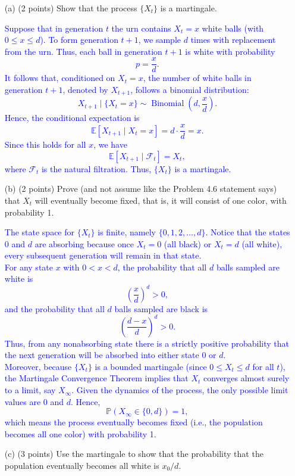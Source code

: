 \documentclass{article}
\begin{document}
\begin{enumerate}
    \item[(a)] (2 points) Show that the process $\{X_t\}$ is a martingale.

        \textcolor{blue}{Suppose that in generation $t$ the urn contains $X_t = x$ white balls (with $0\le x\le d$). To form generation $t+1$, we sample $d$ times with replacement from the urn. Thus, each ball in generation $t+1$ is white with probability
\[
p = \frac{x}{d}.
\]
It follows that, conditioned on $X_t=x$, the number of white balls in generation $t+1$, denoted by $X_{t+1}$, follows a binomial distribution:
\[
X_{t+1}\mid \{X_t=x\} \sim \operatorname{Binomial}\left(d, \frac{x}{d}\right).
\]
Hence, the conditional expectation is
\[
\mathbb{E}[X_{t+1}\mid X_t=x] = d\cdot \frac{x}{d} = x.
\]
Since this holds for all $x$, we have
\[
\mathbb{E}[X_{t+1}\mid \mathcal{F}_t] = X_t,
\]
where $\mathcal{F}_t$ is the natural filtration. Thus, $\{X_t\}$ is a martingale.
}


    \item[(b)] (2 points) Prove (and not assume like the Problem 4.6 statement says) that $X_t$ will eventually become fixed, that is, it will consist of one color, with probability 1.

    \textcolor{blue}{
        The state space for $\{X_t\}$ is finite, namely $\{0,1,2,\ldots,d\}$. Notice that the states $0$ and $d$ are absorbing because once $X_t=0$ (all black) or $X_t=d$ (all white), every subsequent generation will remain in that state. \\
For any state $x$ with $0 < x < d$, the probability that all $d$ balls sampled are white is
\[
\left(\frac{x}{d}\right)^d > 0,
\]
and the probability that all $d$ balls sampled are black is
\[
\left(\frac{d-x}{d}\right)^d > 0.
\]
Thus, from any nonabsorbing state there is a strictly positive probability that the next generation will be absorbed into either state $0$ or $d$. \\ 
Moreover, because $\{X_t\}$ is a bounded martingale (since $0\le X_t\le d$ for all $t$), the Martingale Convergence Theorem implies that $X_t$ converges almost surely to a limit, say $X_\infty$. Given the dynamics of the process, the only possible limit values are $0$ and $d$. Hence,
\[
\mathbb{P}(X_\infty\in\{0,d\})=1,
\]
which means the process eventually becomes fixed (i.e., the population becomes all one color) with probability 1.
}

    \item[(c)] (3 points) Use the martingale to show that the probability that the population eventually becomes all white is $x_0 / d$.


\end{enumerate}
\end{document}
